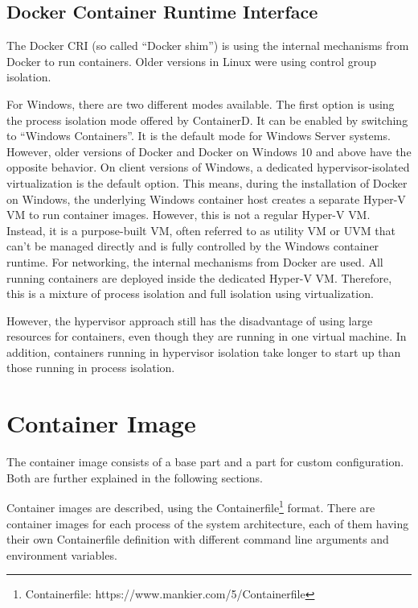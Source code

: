 \subsection{Docker Container Runtime Interface}
The Docker \ac{CRI} (so called \enquote{Docker shim}) is using the internal mechanisms from Docker to run containers. Older versions in Linux were using control group isolation.

For \ac{Windows}, there are two different modes available. The first option is using the process isolation mode offered by ContainerD. It can be enabled by switching to \enquote{\ac{Windows} Containers}. It is the default mode for Windows Server systems. However, older versions of Docker and Docker on Windows 10 and above have the opposite behavior\cite{RamosApolinario.2021}. On client versions of Windows, a dedicated hypervisor-isolated virtualization is the default option\cite{RamosApolinario.2021}. This means, during the installation of Docker on \ac{Windows}, the underlying Windows container host creates a separate Hyper-V \ac{VM} to run container images. However, this is not a regular Hyper-V \ac{VM}. Instead, it is a purpose-built \ac{VM}, often referred to as utility \ac{VM} or UVM that can't be managed directly and is fully controlled by the \ac{Windows} container runtime\cite{RamosApolinario.2021}. For networking, the internal mechanisms from Docker are used. All running containers are deployed inside the dedicated Hyper-V \ac{VM}. Therefore, this is a mixture of process isolation and full isolation using virtualization.

However, the hypervisor approach still has the disadvantage of using large resources for containers, even though they are running in one virtual machine. In addition, containers running in hypervisor isolation take longer to start up than those running in process isolation\cite{RamosApolinario.2021}.




\section{Container Image}
The container image consists of a base part and a part for custom configuration. Both are further explained in the following sections.

Container images are described, using the Containerfile\footnote{Containerfile: https://www.mankier.com/5/Containerfile} format. %
There are container images for each process of the system architecture, each of them having their own Containerfile definition with different command line arguments and environment variables.


